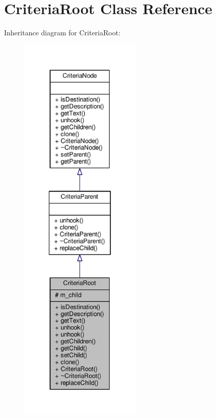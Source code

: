 \hypertarget{classCriteriaRoot}{}\section{Criteria\+Root Class Reference}
\label{classCriteriaRoot}


Inheritance diagram for Criteria\+Root\+:
\nopagebreak
\begin{figure}[H]
\begin{center}
\leavevmode
\includegraphics[height=550pt]{dc/d53/classCriteriaRoot__inherit__graph}
\end{center}
\end{figure}


